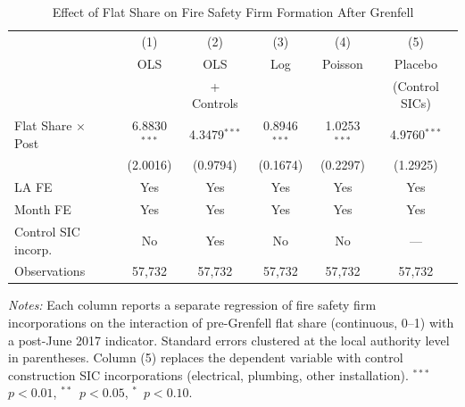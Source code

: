 \begin{table}[htbp]
\centering
\caption{Effect of Flat Share on Fire Safety Firm Formation After Grenfell}
\label{tab:main}
\begin{tabular}{lccccc}
\hline\hline
 & (1) & (2) & (3) & (4) & (5) \\
 & OLS & OLS & Log & Poisson & Placebo \\
 & & + Controls & & & (Control SICs) \\
\hline
Flat Share $\times$ Post & 6.8830$^{***}$ & 4.3479$^{***}$ & 0.8946$^{***}$ & 1.0253$^{***}$ & 4.9760$^{***}$ \\
 & (2.0016) & (0.9794) & (0.1674) & (0.2297) & (1.2925) \\
\hline
LA FE & Yes & Yes & Yes & Yes & Yes \\
Month FE & Yes & Yes & Yes & Yes & Yes \\
Control SIC incorp. & No & Yes & No & No & --- \\
Observations & 57,732 & 57,732 & 57,732 & 57,732 & 57,732 \\
\hline\hline
\end{tabular}
\begin{tablenotes}[flushleft]
\small
\item \textit{Notes:} Each column reports a separate regression of fire safety firm incorporations on the interaction of pre-Grenfell flat share (continuous, 0--1) with a post-June 2017 indicator. Standard errors clustered at the local authority level in parentheses. Column (5) replaces the dependent variable with control construction SIC incorporations (electrical, plumbing, other installation). $^{***}$~$p<0.01$, $^{**}$~$p<0.05$, $^{*}$~$p<0.10$.
\end{tablenotes}
\end{table}
